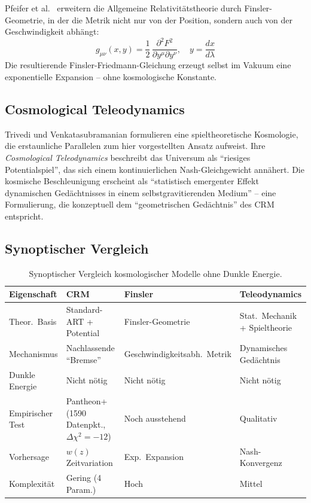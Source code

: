 \documentclass[aps,prd,twocolumn,superscriptaddress,nofootinbib]{revtex4-2}
\begin{document}
Pfeifer et al.\ \cite{Pfeifer2025} erweitern die Allgemeine Relativit\"atstheorie durch Finsler-Geometrie, in der die Metrik nicht nur von der Position, sondern auch von der Geschwindigkeit abh\"angt:
\begin{equation}
g_{\mu\nu}(x, y) = \frac{1}{2}\,\frac{\partial^2 F^2}{\partial y^\mu \partial y^\nu}, \quad y = \frac{dx}{d\lambda}
\end{equation}
Die resultierende Finsler-Friedmann-Gleichung erzeugt selbst im Vakuum eine exponentielle Expansion -- ohne kosmologische Konstante.

\subsection{Cosmological Teleodynamics}

Trivedi und Venkatasubramanian \cite{Trivedi2025} formulieren eine spieltheoretische Kosmologie, die erstaunliche Parallelen zum hier vorgestellten Ansatz aufweist. Ihre \textit{Cosmological Teleodynamics} beschreibt das Universum als ``riesiges Potentialspiel'', das sich einem kontinuierlichen Nash-Gleichgewicht ann\"ahert. Die kosmische Beschleunigung erscheint als ``statistisch emergenter Effekt dynamischen Ged\"achtnisses in einem selbstgravitierenden Medium'' -- eine Formulierung, die konzeptuell dem ``geometrischen Ged\"achtnis'' des CRM entspricht.

\subsection{Synoptischer Vergleich}
\label{subsec:synopse}

\begin{table}[tbp]
\centering
\caption{Synoptischer Vergleich kosmologischer Modelle ohne Dunkle Energie.}
\label{tab:synopse}
\begin{tabular}{llll}
\toprule
\textbf{Eigenschaft} & \textbf{CRM} & \textbf{Finsler} & \textbf{Teleodynamics} \\
\midrule
Theor.\ Basis & Standard-ART + Potential & Finsler-Geometrie & Stat.\ Mechanik + Spieltheorie \\
Mechanismus & Nachlassende ``Bremse'' & Geschwindigkeitsabh.\ Metrik & Dynamisches Ged\"achtnis \\
Dunkle Energie & Nicht n\"otig & Nicht n\"otig & Nicht n\"otig \\
Empirischer Test & Pantheon+ (1590 Datenpkt., $\Delta\chi^2{=}{-}12$) & Noch ausstehend & Qualitativ \\
Vorhersage & $w(z)$ Zeitvariation & Exp.\ Expansion & Nash-Konvergenz \\
Komplexit\"at & Gering (4 Param.) & Hoch & Mittel \\
\bottomrule
\end{tabular}
\end{table}
\end{document}
